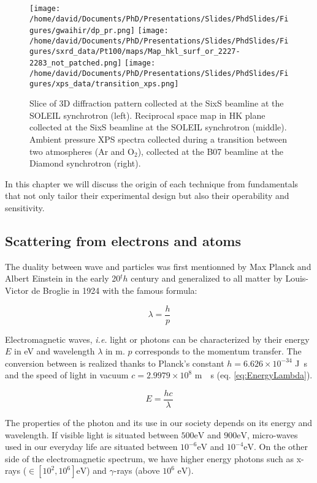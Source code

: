 \begin{figure}[!htb]
    \centering
    \texttt{[image: /home/david/Documents/PhD/Presentations/Slides/PhdSlides/Figures/gwaihir/dp\_pr.png]}
    \texttt{[image: /home/david/Documents/PhD/Presentations/Slides/PhdSlides/Figures/sxrd\_data/Pt100/maps/Map\_hkl\_surf\_or\_2227-2283\_not\_patched.png]}
    \texttt{[image: /home/david/Documents/PhD/Presentations/Slides/PhdSlides/Figures/xps\_data/transition\_xps.png]}
    \caption{Slice of 3D diffraction pattern collected at the SixS beamline at the SOLEIL synchrotron (left). Reciprocal space map in HK plane collected at the SixS beamline at the SOLEIL synchrotron (middle). Ambient pressure XPS spectra collected during a transition between two atmospheres (Ar and O$_2$), collected at the B07 beamline at the Diamond synchrotron (right).}
\end{figure}


In this chapter we will discuss the origin of each technique from fundamentals that not only tailor their experimental design but also their operability and sensitivity.

\subsection{Scattering from electrons and atoms}

The duality between wave and particles was first mentionned by Max Planck and Albert Einstein in the early 20${^th}$ century and generalized to all matter by Louis-Victor de Broglie in 1924 with the famous formula:

\begin{equation}
	\lambda = \frac{h}{p}
\end{equation}

Electromagnetic waves, \textit{i.e.} light or photons can be characterized by their energy $E$ in \si{\electronvolt} and wavelength $\lambda$ in \si{\meter}. $p$ corresponds to the momentum transfer.
The conversion between is realized thanks to Planck's constant $h = 6.626 \times 10^{-34}$ \si{\joule.\second} and the speed of light in vacuum $c = 2.9979 \times 10^{8}$ \si{\meter.\per \second} (eq. \ref{eq:EnergyLambda}).

\begin{equation}
    \label{eq:EnergyLambda}
	E = \frac{hc}{\lambda}
\end{equation}

The properties of the photon and its use in our society depends on its energy and wavelength.
If visible light is situated between $500 \si{\electronvolt}$ and $900 \si{\electronvolt}$, micro-waves used in our everyday life are situated between $10^{-6} \si{\electronvolt}$ and $10^{-4}\si{\electronvolt}$.
On the other side of the electromagnetic spectrum, we have higher energy photons such as x-rays ($\in [10^{2}, 10^{6}] \si{\electronvolt}$) and $\gamma$-rays (above $10^{6}$ $\si{\electronvolt}$).

